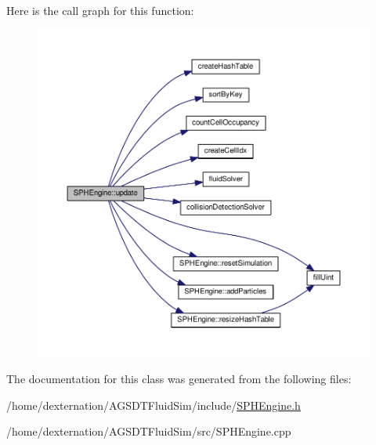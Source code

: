 Here is the call graph for this function\-:\nopagebreak
\begin{figure}[H]
\begin{center}
\leavevmode
\includegraphics[width=350pt]{class_s_p_h_engine_a1a17b5c04756850b68cf95b917019241_cgraph}
\end{center}
\end{figure}




The documentation for this class was generated from the following files\-:\begin{DoxyCompactItemize}
\item 
/home/dexternation/\-A\-G\-S\-D\-T\-Fluid\-Sim/include/\hyperlink{_s_p_h_engine_8h}{S\-P\-H\-Engine.\-h}\item 
/home/dexternation/\-A\-G\-S\-D\-T\-Fluid\-Sim/src/S\-P\-H\-Engine.\-cpp\end{DoxyCompactItemize}
